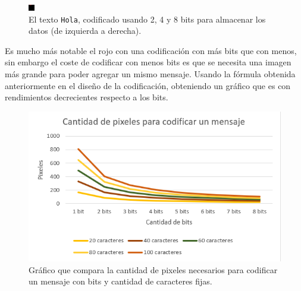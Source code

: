 \documentclass[conference]{IEEEtran}
\begin{document}
\begin{figure}[H]
\begin{multicols}{3}
    \includegraphics[width=0.95\linewidth]{image/black8.png} \par
\end{multicols}
\caption{El texto \texttt{Hola}, codificado usando 2, 4 y 8 bits para almacenar los datos (de izquierda a derecha).}
\end{figure}

	Es mucho más notable el rojo con una codificación con más bits que con menos, sin embargo el coste de codificar con menos bits es que se necesita una imagen más grande para poder agregar un mismo mensaje. Usando la fórmula obtenida anteriormente en el diseño de la codificación, obteniendo un gráfico que es con rendimientos decrecientes respecto a los bits.
	
\begin{figure}[H]
    \centering
    \includegraphics[width=0.95\linewidth]{image/Grafico2.png}
\caption{Gráfico que compara la cantidad de pixeles necesarios para codificar un mensaje con bits y cantidad de caracteres fijas.}
\end{figure}
	
\end{document}

